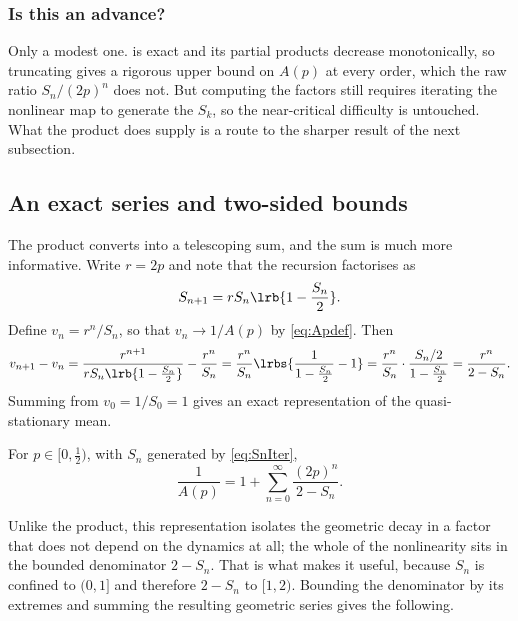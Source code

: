 \subsubsection*{Is this an advance?}

Only a modest one.  is exact and its partial products decrease
monotonically, so truncating gives a rigorous upper bound on $A(p)$ at every order,
which the raw ratio $S_n/(2p)^n$ does not. But computing the factors still requires
iterating the nonlinear map to generate the $S_k$, so the near-critical difficulty
is untouched. What the product does supply is a route to the sharper result of the
next subsection.

\subsection{An exact series and two-sided bounds}
\label{sec:Abounds}

The product converts into a telescoping sum, and the sum is much more informative.
Write $r=2p$ and note that the recursion factorises as
\begin{equation*}
S_{n+1} = rS_n\lrb{1-\frac{S_n}{2}} .
\end{equation*}
Define $v_n = r^n/S_n$, so that $v_n\to1/A(p)$ by \cref{eq:Apdef}. Then
\begin{equation*}
v_{n+1}-v_n
= \frac{r^{n+1}}{rS_n\lrb{1-\frac{S_n}{2}}} - \frac{r^n}{S_n}
= \frac{r^n}{S_n}\lrbs{\frac{1}{1-\frac{S_n}{2}}-1}
= \frac{r^n}{S_n}\cdot\frac{S_n/2}{1-\frac{S_n}{2}}
= \frac{r^n}{2-S_n} .
\end{equation*}
Summing from $v_0 = 1/S_0 = 1$ gives an exact representation of the
quasi-stationary mean.

\begin{proposition}
\label{prop:series}
For $p\in[0,\tfrac12)$, with $S_n$ generated by \cref{eq:SnIter},
\begin{equation}
\label{eq:Aseries}
\frac{1}{A(p)} = 1 + \sum_{n=0}^{\infty}\frac{(2p)^n}{2-S_n} .
\end{equation}
\end{proposition}

\noindent
Unlike the product, this representation isolates the geometric decay in a factor
that does not depend on the dynamics at all; the whole of the nonlinearity sits in
the bounded denominator $2-S_n$. That is what makes it useful, because $S_n$ is
confined to $(0,1]$ and therefore $2-S_n$ to $[1,2)$. Bounding the denominator by
its extremes and summing the resulting geometric series gives the following.

